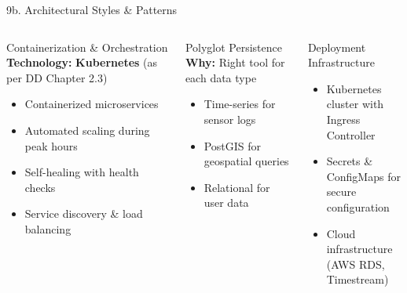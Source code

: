 \documentclass[aspectratio=169, 10pt]{beamer}
\begin{document}
\begin{frame}{9b. Architectural Styles \& Patterns}
    \begin{columns}[T]
        
        
        \begin{block}{Containerization \& Orchestration}
            \textbf{Technology:} \textbf{Kubernetes} (as per DD Chapter 2.3)
            \begin{itemize}
                \item Containerized microservices
                \item Automated scaling during peak hours
                \item Self-healing with health checks
                \item Service discovery \& load balancing
            \end{itemize}
        \end{block}
        

        \begin{block}{Polyglot Persistence}
            \textbf{Why:} Right tool for each data type
            \begin{itemize}
                \item Time-series for sensor logs
                \item PostGIS for geospatial queries
                \item Relational for user data
            \end{itemize}
        \end{block}
        
        \begin{block}{Deployment Infrastructure}
            \begin{itemize}
                \item Kubernetes cluster with Ingress Controller
                \item Secrets \& ConfigMaps for secure configuration
                \item Cloud infrastructure (AWS RDS, Timestream)
            \end{itemize}
        \end{block}
    \end{columns}
\end{frame}
\end{document}
